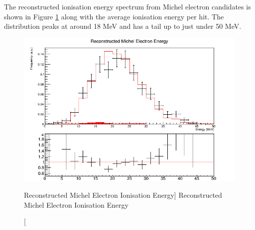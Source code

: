 The reconstructed ionisation energy spectrum from Michel electron candidates is
shown in Figure \ref{fig:michel_ion_reco} along with the average ionisation
energy per hit. The distribution peaks at around 18 MeV and has a tail up to 
just under 50 MeV.
\begin{figure}
	\centering
	\includegraphics[width=\textwidth]{figures/michel_ion_reco.png}
	\caption
	[Reconstructed Michel Electron Ionisation Energy]
	{Reconstructed Michel Electron Ionisation Energy}
	\label{fig:michel_ion_reco}
\end{figure}


